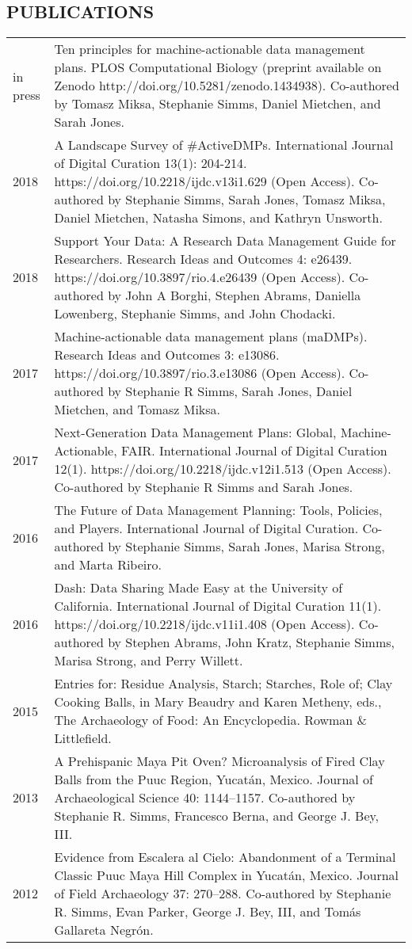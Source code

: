 \documentclass[10pt,centered]{res} %
\begin{document}
\begin{resume}
\section{\color{ResumeBlue}PUBLICATIONS}
\begin{tabular}{p{.5in}p{5.25in}<{\raggedright\arraybackslash}}
in press & Ten principles for machine-actionable data management plans. PLOS Computational Biology (preprint available on Zenodo http://doi.org/10.5281/zenodo.1434938). Co-authored by Tomasz Miksa, Stephanie Simms, Daniel Mietchen, and Sarah Jones. \\
2018 & A Landscape Survey of \#ActiveDMPs. International Journal of Digital Curation 13(1): 204-214. https://doi.org/10.2218/ijdc.v13i1.629 (Open Access). Co-authored by Stephanie Simms, Sarah Jones, Tomasz Miksa, Daniel Mietchen, Natasha Simons, and Kathryn Unsworth. \\
2018 & Support Your Data: A Research Data Management Guide for Researchers. Research Ideas and Outcomes 4: e26439. https://doi.org/10.3897/rio.4.e26439 (Open Access). Co-authored by John A Borghi, Stephen Abrams, Daniella Lowenberg, Stephanie Simms, and John Chodacki. \\
2017 & Machine-actionable data management plans (maDMPs). Research Ideas and Outcomes 3: e13086. https://doi.org/10.3897/rio.3.e13086 (Open Access). Co-authored by Stephanie R Simms, Sarah Jones, Daniel Mietchen, and Tomasz Miksa. \\
2017 & Next-Generation Data Management Plans: Global, Machine-Actionable, FAIR. International Journal of Digital Curation 12(1). https://doi.org/10.2218/ijdc.v12i1.513 (Open Access). Co-authored by Stephanie R Simms and Sarah Jones. \\
2016 & The Future of Data Management Planning: Tools, Policies, and Players. International Journal of Digital Curation. Co-authored by Stephanie Simms, Sarah Jones, Marisa Strong, and Marta Ribeiro. \\
2016 & Dash: Data Sharing Made Easy at the University of California. International Journal of Digital Curation 11(1). https://doi.org/10.2218/ijdc.v11i1.408 (Open Access). Co-authored by Stephen Abrams, John Kratz, Stephanie Simms, Marisa Strong, and Perry Willett. \\
2015 & Entries for: Residue Analysis, Starch; Starches, Role of; Clay Cooking Balls, in Mary Beaudry and Karen Metheny, eds., The Archaeology of Food: An Encyclopedia. Rowman \& Littlefield. \\
2013 & A Prehispanic Maya Pit Oven? Microanalysis of Fired Clay Balls from the Puuc
Region, Yucat\'{a}n, Mexico. Journal of Archaeological Science 40: 1144--1157. Co-authored by Stephanie R. Simms, Francesco Berna, and George J. Bey, III. \\
2012 & Evidence from Escalera al Cielo: Abandonment of a Terminal Classic Puuc Maya Hill
Complex in Yucat\'{a}n, Mexico. Journal of Field Archaeology 37: 270--288. Co-authored by Stephanie R. Simms, Evan Parker, George J. Bey, III, and Tom\'{a}s Gallareta Negr\'{o}n. \\
\end{tabular}


\end{resume}
\end{document}
